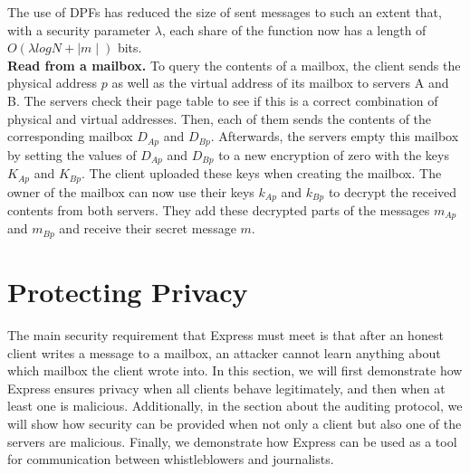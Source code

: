 \documentclass[a4paper]{article}
\begin{document}
The use of DPFs has reduced the size of sent messages to such an extent that, with a security parameter $\lambda$, each share of the function now has a length of $O(\lambda log N + \mid m \mid)$ bits. \\
\textbf{Read from a mailbox.} To query the contents of a mailbox, the client sends the physical address $p$ as well as the virtual address of its mailbox to servers A and B. The servers check their page table to see if this is a correct combination of physical and virtual addresses. Then, each of them sends the contents of the corresponding mailbox $D_{Ap}$ and $D_{Bp}$. Afterwards, the servers empty this mailbox by setting the values of $D_{Ap}$ and $D_{Bp}$ to a new encryption of zero with the keys $K_{Ap}$ and $K_{Bp}$. The client uploaded these keys when creating the mailbox. The owner of the mailbox can now use their keys $k_{Ap}$ and $k_{Bp}$ to decrypt the received contents from both servers. They add these decrypted parts of the messages $m_{Ap}$ and $m_{Bp}$ and receive their secret message $m$. 

\section{Protecting Privacy} %
\label{sec:protecting}
The main security requirement that Express must meet is that after an honest client writes a message to a mailbox, an attacker cannot learn anything about which mailbox the client wrote into. 
In this section, we will first demonstrate how Express ensures privacy when all clients behave legitimately, and then when at least one is malicious. Additionally, in the section about the auditing protocol, we will show how security can be provided when not only a client but also one of the servers are malicious. Finally, we demonstrate how Express can be used as a tool for communication between whistleblowers and journalists.  
\end{document}
